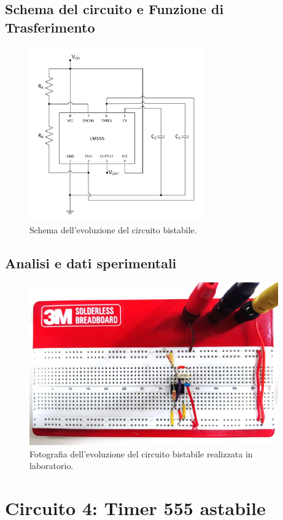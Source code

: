 \documentclass{report}
\begin{document}
\subsection{Schema del circuito e Funzione di Trasferimento}
\begin{figure}[h!]
	\centering
	\includegraphics[height=7.5cm]{immagini/schema3}
	\caption{Schema dell'evoluzione del circuito bistabile.}
	\label{figura:schema3}
\end{figure}
\subsection{Analisi e dati sperimentali}
\begin{figure}[h!]
	\centering
	\includegraphics[height=7cm]{immagini/circuito3}
	\caption{Fotografia dell'evoluzione del circuito bistabile realizzata in laboratorio.}
	\label{figura:circuito3}
\end{figure}
\newpage
\section{Circuito 4: Timer 555 astabile}
\end{document}
